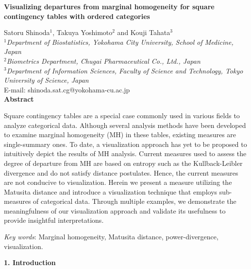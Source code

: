 \documentclass[a4j,12pt]{article}
\begin{document}
\baselineskip

\pagestyle{plain}
\begin{center}
{\large \bf Visualizing departures from marginal homogeneity for square contingency tables with ordered categories}

\vspace{1cm}
Satoru Shinoda${}^{1}$, Takuya Yoshimoto${}^{2}$ and  Kouji Tahata${}^{3}$\\
\vspace{1cm}
${}^{1}${\it Department of Biostatistics, Yokohama City University, School of Medicine, Japan}\\
${}^{2}${\it Biometrics Department, Chugai Pharmaceutical Co., Ltd., Japan}\\
${}^{3}${\it Department of Information Sciences, Faculty of Science and Technology, Tokyo University of Science, Japan}\\
\vspace{0.5cm}
E-mail: shinoda.sat.cg@yokohama-cu.ac.jp\\
\vspace{0.5cm}
{\bf Abstract}
\end{center}

Square contingency tables are a special case commonly used in various fields to analyze categorical data. 
Although several analysis methods have been developed to examine marginal homogeneity (MH) in these tables, existing measures are single-summary ones. 
To date, a visualization approach has yet to be proposed to intuitively depict the results of MH analysis. 
Current measures used to assess the degree of departure from MH are based on entropy such as the Kullback-Leibler divergence and do not satisfy distance postulates. 
Hence, the current measures are not conducive to visualization.
Herein we present a measure utilizing the Matusita distance and introduce a visualization technique that employs sub-measures of categorical data. 
Through multiple examples, we demonstrate the meaningfulness of our visualization approach and validate its usefulness to provide insightful interpretations.

\vspace{0.5cm}
\begin{flushleft}
\textit{Key words}: Marginal homogeneity, Matusita distance, power-divergence, visualization.
\\
\end{flushleft}

\newpage
\noindent \textbf{\large 1. Introduction}
\end{document}
